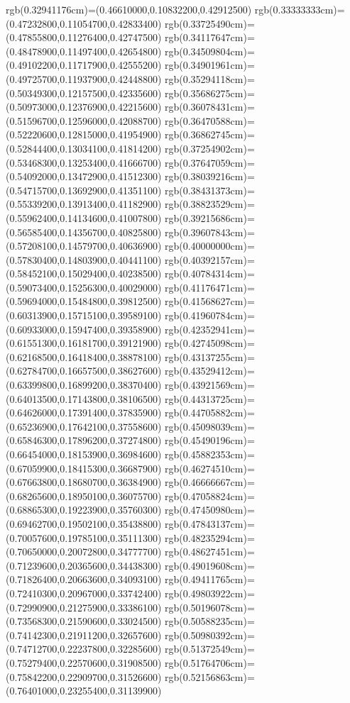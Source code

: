 {{rgb(0.32941176cm)=(0.46610000,0.10832200,0.42912500)
rgb(0.33333333cm)=(0.47232800,0.11054700,0.42833400)
rgb(0.33725490cm)=(0.47855800,0.11276400,0.42747500)
rgb(0.34117647cm)=(0.48478900,0.11497400,0.42654800)
rgb(0.34509804cm)=(0.49102200,0.11717900,0.42555200)
rgb(0.34901961cm)=(0.49725700,0.11937900,0.42448800)
rgb(0.35294118cm)=(0.50349300,0.12157500,0.42335600)
rgb(0.35686275cm)=(0.50973000,0.12376900,0.42215600)
rgb(0.36078431cm)=(0.51596700,0.12596000,0.42088700)
rgb(0.36470588cm)=(0.52220600,0.12815000,0.41954900)
rgb(0.36862745cm)=(0.52844400,0.13034100,0.41814200)
rgb(0.37254902cm)=(0.53468300,0.13253400,0.41666700)
rgb(0.37647059cm)=(0.54092000,0.13472900,0.41512300)
rgb(0.38039216cm)=(0.54715700,0.13692900,0.41351100)
rgb(0.38431373cm)=(0.55339200,0.13913400,0.41182900)
rgb(0.38823529cm)=(0.55962400,0.14134600,0.41007800)
rgb(0.39215686cm)=(0.56585400,0.14356700,0.40825800)
rgb(0.39607843cm)=(0.57208100,0.14579700,0.40636900)
rgb(0.40000000cm)=(0.57830400,0.14803900,0.40441100)
rgb(0.40392157cm)=(0.58452100,0.15029400,0.40238500)
rgb(0.40784314cm)=(0.59073400,0.15256300,0.40029000)
rgb(0.41176471cm)=(0.59694000,0.15484800,0.39812500)
rgb(0.41568627cm)=(0.60313900,0.15715100,0.39589100)
rgb(0.41960784cm)=(0.60933000,0.15947400,0.39358900)
rgb(0.42352941cm)=(0.61551300,0.16181700,0.39121900)
rgb(0.42745098cm)=(0.62168500,0.16418400,0.38878100)
rgb(0.43137255cm)=(0.62784700,0.16657500,0.38627600)
rgb(0.43529412cm)=(0.63399800,0.16899200,0.38370400)
rgb(0.43921569cm)=(0.64013500,0.17143800,0.38106500)
rgb(0.44313725cm)=(0.64626000,0.17391400,0.37835900)
rgb(0.44705882cm)=(0.65236900,0.17642100,0.37558600)
rgb(0.45098039cm)=(0.65846300,0.17896200,0.37274800)
rgb(0.45490196cm)=(0.66454000,0.18153900,0.36984600)
rgb(0.45882353cm)=(0.67059900,0.18415300,0.36687900)
rgb(0.46274510cm)=(0.67663800,0.18680700,0.36384900)
rgb(0.46666667cm)=(0.68265600,0.18950100,0.36075700)
rgb(0.47058824cm)=(0.68865300,0.19223900,0.35760300)
rgb(0.47450980cm)=(0.69462700,0.19502100,0.35438800)
rgb(0.47843137cm)=(0.70057600,0.19785100,0.35111300)
rgb(0.48235294cm)=(0.70650000,0.20072800,0.34777700)
rgb(0.48627451cm)=(0.71239600,0.20365600,0.34438300)
rgb(0.49019608cm)=(0.71826400,0.20663600,0.34093100)
rgb(0.49411765cm)=(0.72410300,0.20967000,0.33742400)
rgb(0.49803922cm)=(0.72990900,0.21275900,0.33386100)
rgb(0.50196078cm)=(0.73568300,0.21590600,0.33024500)
rgb(0.50588235cm)=(0.74142300,0.21911200,0.32657600)
rgb(0.50980392cm)=(0.74712700,0.22237800,0.32285600)
rgb(0.51372549cm)=(0.75279400,0.22570600,0.31908500)
rgb(0.51764706cm)=(0.75842200,0.22909700,0.31526600)
rgb(0.52156863cm)=(0.76401000,0.23255400,0.31139900)
}}
